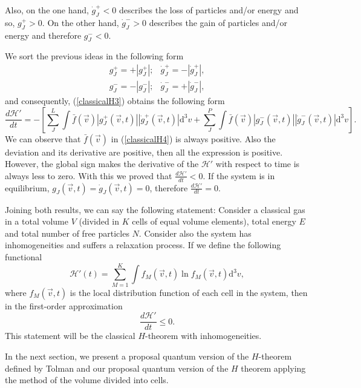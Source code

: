Also, on the one hand, $\dot{g}^{+}_{J}<0$ describes the loss of particles
and/or energy and so, $g^{+}_{J}>0$. On the other hand, $\dot{g}^{-}_{J}>0$
describes the gain of particles and/or energy and therefore $g^{-}_{J}<0$. 

We sort the previous ideas in the following form
%
\begin{equation}\label{separacionclassical}
\begin{array}{rl}
  g^{+}_{J}=+|g^{+}_{J}|; & \dot{g}^{+}_{J}=-|\dot{g}^{+}_{J}|,\\
  g^{-}_{J}=-|g^{-}_{J}|; & \dot{g}^{-}_{J}=+|\dot{g}^{-}_{J}|,
 \end{array}
\end{equation}
%
and consequently, (\ref{classicalH3}) obtains the following form
%
\begin{equation}
    \frac{d\mathcal{H}'}{dt}=-\left[
      \sum_J^{L}\int\bar f(\vec{v})|g_J^{+}(\vec{v},t)|
        |\dot g_J^{+}(\vec{v},t)|\mathrm{d}^3v
      +\sum_J^{P}\int\bar f(\vec{v})|g_J^{-}(\vec{v},t)|
      |\dot g_J^{-}(\vec{v},t)|\mathrm{d}^3v 
    \right]. \label{classicalH4}
\end{equation}
%
We can observe that $\bar{f}(\vec{v})$ in (\ref{classicalH4}) is always
positive. Also the deviation and its derivative are positive, then all the
expression is positive. However, the global sign makes the derivative of the
$\mathcal{H}'$ with respect to time is always less to zero. With this we proved that
$\frac{d\mathcal{H}'}{dt}<0$. If the system is in equilibrium,
$g_{J}(\vec{v},t)=\dot g_J(\vec{v},t)=0$, therefore $\frac{d\mathcal{H}'}{dt}=0$.

Joining both results, we can say the following statement:
Consider a classical gas in a total volume $V$ (divided in $K$ cells of equal
volume elements), total energy $E$ and total number of free particles $N$.
Consider also the system has inhomogeneities and suffers a relaxation process.
If we define the following functional
%
\begin{equation}\label{CH3}
   \mathcal{H}'(t)=\sum_{M=1}^{K}\int f_M(\vec{v},t) \ln f_M(\vec{v},t)\mathrm{d}^3v,
\end{equation}
%
where $f_M(\vec{v},t)$ is the local distribution function of each cell in the
system, then in the first-order approximation
%
\begin{equation}
    \frac{d\mathcal{H}'}{dt} \leq 0.
\end{equation}
%
This statement will be the classical $H$-theorem with inhomogeneities.

In the next section, we present a proposal quantum version of the
$H$-theorem defined by Tolman and our proposal quantum version of the $H$
theorem applying the method of the volume divided into cells.


